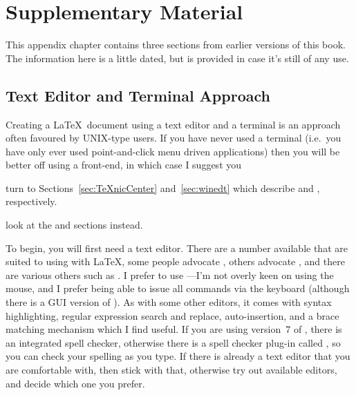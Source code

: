 \chapter{Supplementary Material}
\label{ch:supp}

This appendix chapter contains three sections from earlier versions of this
book. The information here is a little dated, but is provided in
case it's still of any use.


\section{Text Editor and Terminal Approach}
\label{sec:editorandterminal}

Creating a \LaTeX\ document using a text editor and a terminal
is an approach often favoured by UNIX-type users. If you have never
used a terminal (i.e.\ you have only ever used point-and-click menu
driven applications) then you will be better off using a
front-end, in which case I suggest you
\begin{latexonly}%
turn to Sections~\ref{sec:TeXnicCenter} and~\ref{sec:winedt} which 
describe  and , respectively.
\end{latexonly}
\begin{htmlonly}
look at the  and 
 sections instead.
\end{htmlonly}
\par
To begin, you will first need a text editor. There are a number available that are suited 
to using with \LaTeX, some people advocate
,
others advocate , and
there are various others such as
.  I prefer to use
---I'm not overly keen on using the mouse, and I prefer
being able to issue all commands via the keyboard (although 
there is a GUI version of ). As with some other
editors, it comes with syntax highlighting, regular expression search
and replace, auto-insertion, and a brace matching mechanism which I
find useful. If you are using version~7 of , there is an
integrated spell checker, otherwise there is a spell checker plug-in
called
,
so you can check your spelling as you type.  If there is already a
text editor that you are comfortable with, then stick with that,
otherwise try out available editors, and decide which one you prefer.

